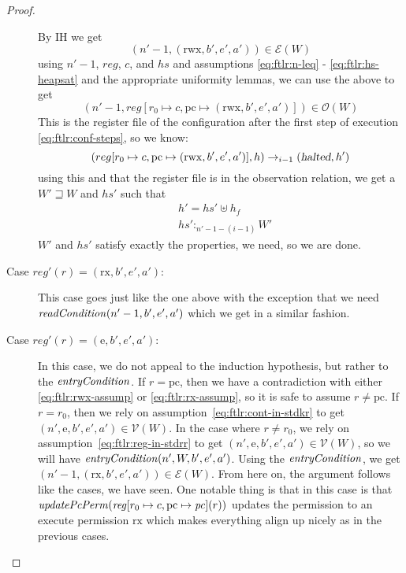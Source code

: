 \documentclass[a4paper]{article}
\newcommand{\var}[1]{\mathit{#1}}
\newcommand{\hs}{\var{hs}}
\newcommand{\pc}{\mathit{pc}}
\newcommand{\pcreg}{\mathrm{pc}}
\newcommand{\reg}{\var{reg}}
\newcommand{\heap}{\var{heap}}
\newcommand{\halted}{\textsl{halted}}
\newcommand{\plainfun}[2]{
  \ifthenelse{\equal{#2}{}}
             {\mathit{#1}}
             {\mathit{#1}(#2)}
}
\newcommand{\updatePcPerm}[1]{\plainfun{updatePcPerm}{#1}}
\newcommand{\readCond}[1]{\plainfun{readCondition}{#1}}
\newcommand{\entryCond}[1]{\plainfun{entryCondition}{#1}}
\newcommand{\future}{\mathbin{\sqsupseteq}}
\newcommand{\heapSat}[3][\heap]{#1 :_{#2} #3}
\newcommand{\asmType}{\plaindom{AsmType}}
\newcommand{\plaindom}[1]{\mathrm{#1}}
\newcommand{\intr}[2]{\mathcal{#1}}
\newcommand{\valueintr}[1]{\intr{V}{#1}}
\newcommand{\exprintr}[1]{\intr{E}{#1}}
\newcommand{\stdvr}{\valueintr{\asmType}}
\newcommand{\stder}{\exprintr{\asmType}}
\newcommand{\observations}{\mathcal{O}}
\newcommand{\npair}[2][n]{\left(#1,#2 \right)}
\newcommand{\plainperm}[1]{\mathrm{#1}}
\newcommand{\exec}{\plainperm{rx}}
\newcommand{\entry}{\plainperm{e}}
\newcommand{\rwx}{\plainperm{rwx}}
\newcommand{\step}[1][]{\rightarrow_{#1}}
\begin{document}
\begin{proof}
\begin{description}
By IH we get 
\begin{equation}
  \npair[n'-1]{(\rwx,b',e',a')} \in \stder(W) \nonumber
\end{equation}
using $n'-1$, $\reg$, $c$, and $\hs$ and assumptions \ref{eq:ftlr:n-leq} - \ref{eq:ftlr:hs-heapsat} and the appropriate uniformity lemmas, we can use the above to get
\begin{equation}
  \npair[n'-1]{reg[r_0 \mapsto c, \pcreg \mapsto (\rwx,b',e',a')]} \in \observations(W) \nonumber
\end{equation}
This is the register file of the configuration after the first step of execution \ref{eq:ftlr:conf-steps}, so we know:
\begin{equation}
  (reg[r_0 \mapsto c, \pcreg \mapsto (\rwx,b',e',a')],h) \step[i-1] (\halted, h') \nonumber
\end{equation}
using this and that the register file is in the observation relation, we get a $W' \future W$ and $\hs'$ such that 
\begin{align*}
  &h' = \hs' \uplus h_f \\
  &\heapSat[\hs']{n'-1-(i-1)}{W'}
\end{align*}
$W'$ and $\hs'$ satisfy exactly the properties, we need, so we are done.

\item[Case $\reg'(r) = (\exec,b',e',a')$:] This case goes just like the one above with the exception that we need $\readCond{n'-1,b',e',a'}$ which we get in a similar fashion.

\item[Case $\reg'(r) = (\entry,b',e',a')$:] In this case, we do not appeal to the induction hypothesis, but rather to the $\entryCond{}$. If $r=\pcreg$, then we have a contradiction with either \ref{eq:ftlr:rwx-assump} or \ref{eq:ftlr:rx-assump}, so it is safe to assume $r \neq \pcreg$. If $r=r_0$, then we rely on assumption~\ref{eq:ftlr:cont-in-stdkr} to get $\npair[n']{\entry,b',e',a'} \in \stdvr(W)$. In the case where $r \neq r_0$, we rely on assumption~\ref{eq:ftlr:reg-in-stdrr} to get $\npair[n']{\entry,b',e',a'} \in \stdvr(W)$, so we will have $\entryCond{n',W,b',e',a'}$. Using the $\entryCond{}$, we get $\npair[n'-1]{(\exec,b',e',a')}\in \stder(W)$. From here on, the argument follows like the cases, we have seen. One notable thing is that in this case is that $\updatePcPerm{\reg[r_0 \mapsto c, \pcreg \mapsto \pc](r)}$ updates the permission to an execute permission $\exec$ which makes everything align up nicely as in the previous cases.


\end{description}
\end{proof}
\end{document}
